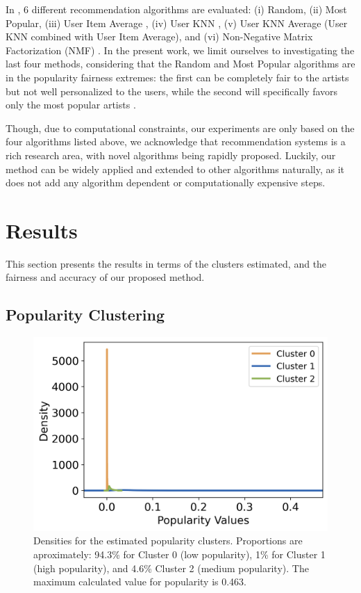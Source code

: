 \documentclass{article}
\begin{document}
In \cite{pap_unfairness}, 6 different 
recommendation algorithms are evaluated:
(i) Random, (ii) Most Popular, (iii) 
User Item Average \cite{koren2010factor},
(iv) User KNN
\cite{schafer2007collaborative}, 
(v) User KNN Average (User KNN combined
with User Item Average), and (vi)
Non-Negative Matrix Factorization (NMF)
\cite{luo2014efficient}. In the present
work, we limit ourselves to investigating
the last 
four methods, considering 
that the Random and Most Popular
algorithms are in the popularity fairness
extremes: the first can be completely
fair to the artists 
but not well personalized to the users,
while the second will specifically favors
only the most popular artists \cite{pap_unfairness}.

Though, due to computational constraints, our experiments are only based on the four algorithms listed
above, we
acknowledge that recommendation systems is a rich 
research area, with novel algorithms being 
rapidly proposed.  Luckily, our method can
be widely applied and extended to other algorithms naturally, as
it does not add any algorithm dependent or computationally
expensive steps. 



\section{Results}\label{sec:methods}

This section presents the results in terms of the 
clusters estimated, and the fairness and accuracy of our
proposed method.


\subsection{Popularity Clustering}\label{sec:pop_cluster}


\begin{figure}[ht]
 \centerline{
 \includegraphics[width=\columnwidth]{img/clusters.png}}
 \caption{Densities for the estimated popularity clusters. Proportions are aproximately: 94.3\% for Cluster 0 (low popularity),  1\%  for Cluster 1 (high popularity), and 4.6\%  Cluster 2 (medium popularity). The maximum calculated value for popularity is 0.463.} 
 \label{fig:clusters}
\end{figure}
\end{document}
